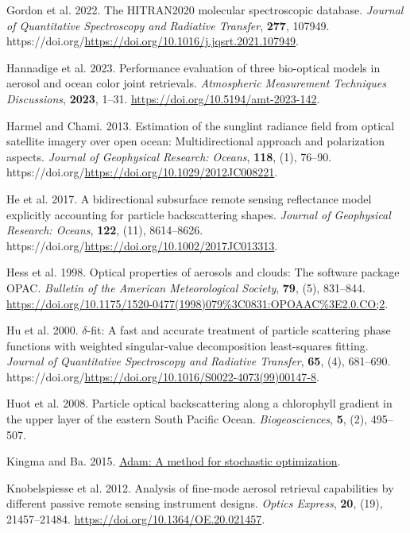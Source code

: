 \documentclass[
  11pt,
  letterpaper,
]{scrreprt}
\newlength{\cslhangindent}
\newenvironment{CSLReferences}[2] %
 {\begin{list}{}{%
  \setlength{\itemindent}{0pt}
  \setlength{\leftmargin}{0pt}
  \setlength{\parsep}{0pt}
  \ifodd #1
   \setlength{\leftmargin}{\cslhangindent}
   \setlength{\itemindent}{-1\cslhangindent}
  \fi
  \setlength{\itemsep}{#2\baselineskip}}}
 {\end{list}}
\begin{document}
\begin{CSLReferences}{1}{1}
Gordon et al. 2022. The HITRAN2020 molecular spectroscopic database.
\emph{Journal of Quantitative Spectroscopy and Radiative Transfer},
\textbf{277}, 107949.
https://doi.org/\url{https://doi.org/10.1016/j.jqsrt.2021.107949}.

Hannadige et al. 2023. Performance evaluation of three bio-optical
models in aerosol and ocean color joint retrievals. \emph{Atmospheric
Measurement Techniques Discussions}, \textbf{2023}, 1--31.
\url{https://doi.org/10.5194/amt-2023-142}.

Harmel and Chami. 2013. Estimation of the sunglint radiance field from
optical satellite imagery over open ocean: Multidirectional approach and
polarization aspects. \emph{Journal of Geophysical Research: Oceans},
\textbf{118}, (1), 76--90.
https://doi.org/\url{https://doi.org/10.1029/2012JC008221}.

He et al. 2017. A bidirectional subsurface remote sensing reflectance
model explicitly accounting for particle backscattering shapes.
\emph{Journal of Geophysical Research: Oceans}, \textbf{122}, (11),
8614--8626. https://doi.org/\url{https://doi.org/10.1002/2017JC013313}.

Hess et al. 1998. Optical properties of aerosols and clouds: The
software package OPAC. \emph{Bulletin of the American Meteorological
Society}, \textbf{79}, (5), 831--844.
\url{https://doi.org/10.1175/1520-0477(1998)079\%3C0831:OPOAAC\%3E2.0.CO;2}.

Hu et al. 2000. {\(\delta\)}-fit: A fast and accurate treatment of
particle scattering phase functions with weighted singular-value
decomposition least-squares fitting. \emph{Journal of Quantitative
Spectroscopy and Radiative Transfer}, \textbf{65}, (4), 681--690.
https://doi.org/\url{https://doi.org/10.1016/S0022-4073(99)00147-8}.

Huot et al. 2008. {Particle optical backscattering along a chlorophyll
gradient in the upper layer of the eastern South Pacific Ocean}.
\emph{Biogeosciences}, \textbf{5}, (2), 495--507.

Kingma and Ba. 2015. \href{https://arxiv.org/abs/1412.6980}{Adam: A
method for stochastic optimization}.

Knobelspiesse et al. 2012. Analysis of fine-mode aerosol retrieval
capabilities by different passive remote sensing instrument designs.
\emph{Optics Express}, \textbf{20}, (19), 21457--21484.
\url{https://doi.org/10.1364/OE.20.021457}.


\end{CSLReferences}
\end{document}
